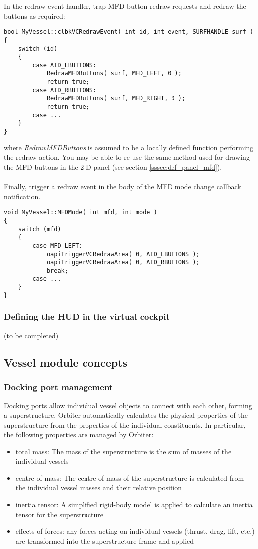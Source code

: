 \documentclass[Orbiter Developer Manual.tex]{subfiles}
\begin{document}
\noindent
In the redraw event handler, trap MFD button redraw requests and redraw the buttons as required:

\begin{lstlisting}
bool MyVessel::clbkVCRedrawEvent( int id, int event, SURFHANDLE surf )
{
	switch (id)
	{
		case AID_LBUTTONS:
			RedrawMFDButtons( surf, MFD_LEFT, 0 );
			return true;
		case AID_RBUTTONS:
			RedrawMFDButtons( surf, MFD_RIGHT, 0 );
			return true;
		case ...
	}
}
\end{lstlisting}

\noindent
where \textit{RedrawMFDButtons} is assumed to be a locally defined function performing the redraw action. You may be able to re-use the same method used for drawing the MFD buttons in the 2-D panel (see section \ref{sssec:def_panel_mfd}).\\
\\
Finally, trigger a redraw event in the body of the MFD mode change callback notification.

\begin{lstlisting}
void MyVessel::MFDMode( int mfd, int mode )
{
	switch (mfd)
	{
		case MFD_LEFT:
			oapiTriggerVCRedrawArea( 0, AID_LBUTTONS );
			oapiTriggerVCRedrawArea( 0, AID_RBUTTONS );
			break;
		case ...
	}
}
\end{lstlisting}


\subsubsection{Defining the HUD in the virtual cockpit}
(to be completed)


\subsection{Vessel module concepts}

\subsubsection{Docking port management}

Docking ports allow individual vessel objects to connect with each other, forming a superstructure. Orbiter automatically calculates the physical properties of the superstructure from the properties of the individual constituents. In particular, the following properties are managed by Orbiter:
\begin{itemize}
\item total mass: The mass of the superstructure is the sum of masses of the individual vessels
\item centre of mass: The centre of mass of the superstructure is calculated from the individual vessel masses and their relative position
\item inertia tensor: A simplified rigid-body model is applied to calculate an inertia tensor for the superstructure
\item effects of forces: any forces acting on individual vessels (thrust, drag, lift, etc.) are transformed into the superstructure frame and applied
\end{itemize}
\end{document}
